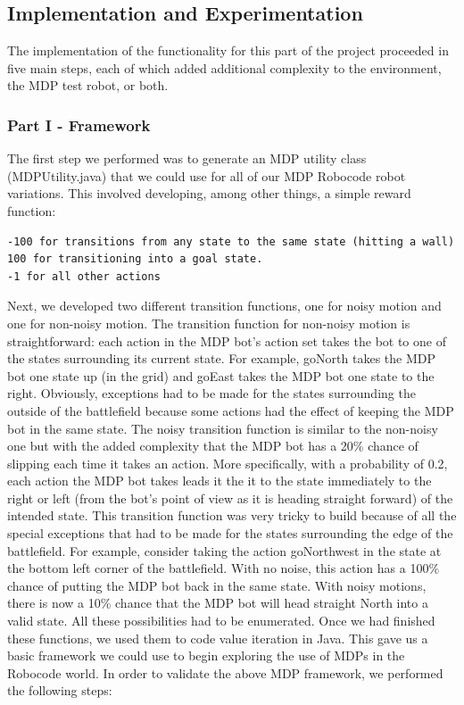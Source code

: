 \documentclass{aiaa-tc}%
\begin{document}
\subsection{Implementation and Experimentation}
The implementation of the functionality for this part of the project proceeded in five main steps, each of which added additional complexity to the environment, the MDP test robot, or both. 
\subsubsection{Part I - Framework}
The first step we performed was to generate an MDP utility class (MDPUtility.java) that we could use for all of our MDP Robocode robot variations.
This involved developing, among other things, a simple reward function:
\begin{verbatim}
-100 for transitions from any state to the same state (hitting a wall)
100 for transitioning into a goal state.
-1 for all other actions	
\end{verbatim}
Next, we developed two different transition functions, one for noisy motion and one for non-noisy motion. The transition function for non-noisy motion is straightforward: each action in the MDP bot's action set takes the bot to one of the states surrounding its current state. For example, goNorth takes the MDP bot one state up (in the grid) and goEast takes the MDP bot one state to the right. Obviously, exceptions had to be made for the states surrounding the outside of the battlefield because some actions had the effect of keeping the MDP bot in the same state. The noisy transition function is similar to the non-noisy one but with the added complexity that the MDP bot has a 20\% chance of slipping each
time it takes an action.
More specifically, with a probability of 0.2, each action the MDP bot takes leads it the it to the state immediately to the right or left (from the bot's point of view as it is heading straight forward) of the intended state. This transition function was very tricky to build because of all the special exceptions that had to be made for the states surrounding the edge of the battlefield. For example, consider taking the action goNorthwest in the state at the bottom left corner of the battlefield. With no noise, this action has a 100\% chance of putting the MDP bot back in the same state. With noisy motions, there is now a 10\% chance that the MDP bot will head straight North into a valid state. All these possibilities had to be enumerated. Once we had finished these functions, we used them to code value iteration in Java. This gave us a basic framework we could use to begin exploring the use of MDPs in the Robocode world. In order to validate the above MDP framework, we performed the following steps:
\end{document}
